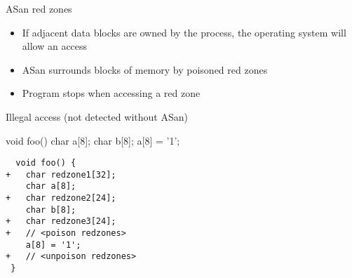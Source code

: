 \begin{frame}[fragile]
  \begin{block}{ASan red zones}
    \begin{itemize}
      \item If adjacent data blocks are owned by the process, the operating system will allow an access
      \item<2> ASan surrounds blocks of memory by poisoned red zones
      \item<2> Program stops when accessing a red zone
    \end{itemize}
  \end{block}
  \begin{exampleblock}{Illegal access (not detected without ASan)}
    \begin{multicols}{2}
      \begin{overprint}
        \begin{cppcode*}{}
          void foo() {
            char a[8];
            char b[8];
            a[8] = '1';
          }
        \end{cppcode*}
        \begin{verbatim}
  void foo() {
+   char redzone1[32];
    char a[8];
+   char redzone2[24];
    char b[8];
+   char redzone3[24];
+   // <poison redzones>
    a[8] = '1';
+   // <unpoison redzones>
 }
        \end{verbatim}
      \end{overprint}
      \columnbreak
    \end{multicols}
    \vspace{1mm}
  \end{exampleblock}
\end{frame}

